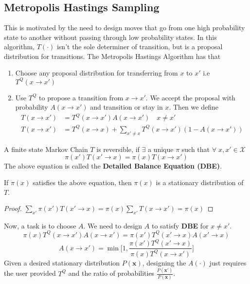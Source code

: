 \subsection{Metropolis Hastings Sampling}
This is motivated by the need to design moves that go from one high probability state to another without passing through low probability states. In this algorithm, $T(\cdot)$ isn't the sole determiner of transition, but is a proposal distribution for transitions. The Metropolis Hastings Algorithm has that
\begin{enumerate}
	\item Choose any proposal distribution for transferring from $x$ to $x'$ i.e $T^Q(x \to x')$
	\item Use $T^Q$ to propose a transition from $x \to x'$. We accept the proposal with probability $A(x \to x')$ and transition or stay in $x$. Then we define
	\begin{align}
		T(x\to x') &= T^Q (x \to x') A(x \to x') \quad x \neq x' \\
		T(x \to x') &= T^Q (x \to x) + \sum_{x' \neq x} T^Q (x\to x') (1 - A(x \to x'))
	\end{align}
\end{enumerate}
\begin{defn}
A finite state Markov Chain $T$ is reversible, if $\exists$ a unique $\pi$ such that $\forall \; x, x' \in \mathcal X$
\begin{equation}
	\pi(x') T(x' \to x) = \pi (x) T(x \to x')
\end{equation}
The above equation is called the \textbf{Detailed Balance Equation (DBE)}.
\end{defn}
\begin{thm}
If $\pi(x)$ satisfies the above equation, then $\pi(x)$ is a stationary distribution of $T$.
\end{thm}
\begin{proof}
$\sum_{x'} \pi(x') T(x' \to x) = \pi(x) \sum_{x'} T(x \to x') = \pi (x)$
\end{proof}
Now, a task is to choose $A$. We need to design $A$ to satisfy \textbf{DBE} for $x \neq x'$.
\[\pi(x)T^Q(x\to x') A(x\to x') = \pi(x') T^Q (x' \to x) A(x' \to x)\]
\begin{equation}
	A(x \to x') = \min\bigg[1, \dfrac{\pi(x')T^Q(x' \to x)}{\pi(x) T^Q(x\to x')}\bigg]
\end{equation}
Given a desired stationary distribution $P(\mathbf x)$, designing the $A(\cdot)$ just requires the user provided $T^Q$ and the ratio of probabilities $\frac{P(\mathbf x')}{P(\mathbf x)}$.